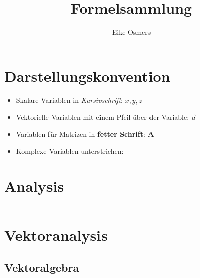 \documentclass[a4paper]{article}
\begin{document}
\title{\textbf{{\Huge Formelsammlung}}}
\author{Eike Osmers}
\maketitle
\thispagestyle{empty}
\newpage

\thispagestyle{empty}
\setcounter{page}{0}
\tableofcontents
\newpage
\setcounter{page}{1}

\section{Darstellungskonvention}

\begin{itemize}
\item[] Skalare Variablen in \textit{Kursivschrift}: $x, y, z$
\item[] Vektorielle Variablen mit einem Pfeil über der Variable: $\vec{a}$
\item[] Variablen für Matrizen in \textbf{fetter Schrift}: $\mathbf{A}$
\item[] Komplexe Variablen unterstrichen: 
\end{itemize}

\newpage
\section{Analysis}
\begin{table}[h]
\centering
\begin{tabular}{@{}>{\bfseries}lc@{}}
\toprule



\bottomrule
\end{tabular}
\end{table}

\newpage
\section{Vektoranalysis}

\subsection{Vektoralgebra}
\end{document}
